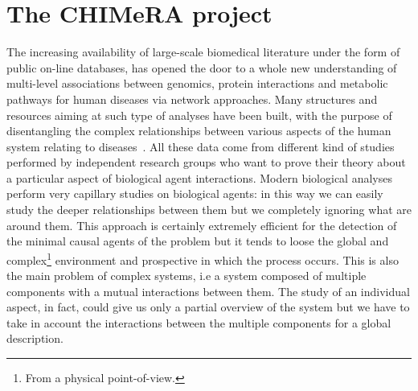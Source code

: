 \documentclass{standalone}
\begin{document}
\section[CHIMeRA]{The CHIMeRA project}\label{chimera:chimera}

The increasing availability of large-scale biomedical literature under the form of public on-line databases, has opened the door to a whole new understanding of multi-level associations between genomics, protein interactions and metabolic pathways for human diseases via network approaches.
Many structures and resources aiming at such type of analyses have been built, with the purpose of disentangling the complex relationships between various aspects of the human system relating to diseases~\cite{SymtomsNet, HumanPhenotype}.
All these data come from different kind of studies performed by independent research groups who want to prove their theory about a particular aspect of biological agent interactions.
Modern biological analyses perform very capillary studies on biological agents: in this way we can easily study the deeper relationships between them but we completely ignoring what are around them.
This approach is certainly extremely efficient for the detection of the minimal causal agents of the problem but it tends to loose the global and complex\footnote{
  From a physical point-of-view.
} environment and prospective in which the process occurs.
This is also the main problem of complex systems, i.e a system composed of multiple components with a mutual interactions between them.
The study of an individual aspect, in fact, could give us only a partial overview of the system but we have to take in account the interactions between the multiple components for a global description.
\end{document}
